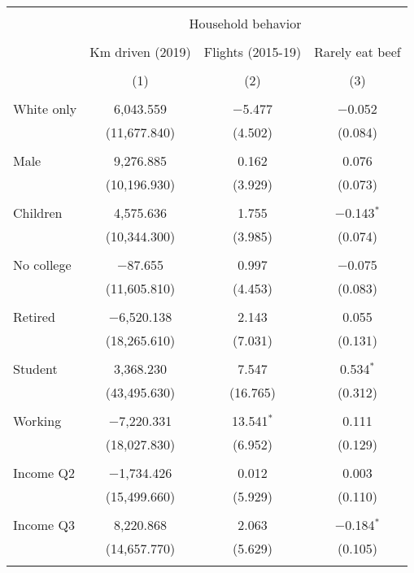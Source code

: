 
\begin{tabular}{@{\extracolsep{5pt}}lccc} 
\\[-1.8ex]\hline 
\hline \\[-1.8ex] 
 & \multicolumn{3}{c}{Household behavior} \\ 
\cline{2-4} 
\\[-1.8ex] & Km driven (2019) & Flights (2015-19) & Rarely eat beef \\ 
\\[-1.8ex] & (1) & (2) & (3)\\ 
\hline \\[-1.8ex] 
 White only & 6,043.559 & $-$5.477 & $-$0.052 \\ 
  & (11,677.840) & (4.502) & (0.084) \\ 
  & & & \\ 
 Male & 9,276.885 & 0.162 & 0.076 \\ 
  & (10,196.930) & (3.929) & (0.073) \\ 
  & & & \\ 
 Children & 4,575.636 & 1.755 & $-$0.143$^{*}$ \\ 
  & (10,344.300) & (3.985) & (0.074) \\ 
  & & & \\ 
 No college & $-$87.655 & 0.997 & $-$0.075 \\ 
  & (11,605.810) & (4.453) & (0.083) \\ 
  & & & \\ 
 Retired & $-$6,520.138 & 2.143 & 0.055 \\ 
  & (18,265.610) & (7.031) & (0.131) \\ 
  & & & \\ 
 Student & 3,368.230 & 7.547 & 0.534$^{*}$ \\ 
  & (43,495.630) & (16.765) & (0.312) \\ 
  & & & \\ 
 Working & $-$7,220.331 & 13.541$^{*}$ & 0.111 \\ 
  & (18,027.830) & (6.952) & (0.129) \\ 
  & & & \\ 
 Income Q2 & $-$1,734.426 & 0.012 & 0.003 \\ 
  & (15,499.660) & (5.929) & (0.110) \\ 
  & & & \\ 
 Income Q3 & 8,220.868 & 2.063 & $-$0.184$^{*}$ \\ 
  & (14,657.770) & (5.629) & (0.105) \\ 
  & & & \\ 

\end{tabular}
